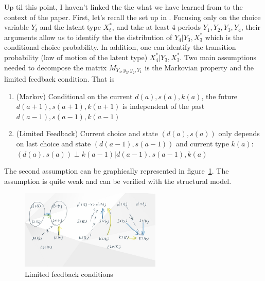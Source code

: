 \documentclass[12pt]{article}
\begin{document}
Up til this point, I haven't linked the the what we have learned from \citet{hu2012nonparametric} to the context of the paper. First, let's recall the set up in \citet{hu2012nonparametric}.
Focusing only on the choice variable $Y_t$ and the latent type $X^*_t$, and take at least 4 periods $Y_1, Y_2,Y_3,Y_4$, their arguments allow us to identify the the distribution of $Y_4|Y_3,X_3^*$ which is the conditional choice probability. In addition, one can identify the transition probability (law of motion of the latent type) $X_4^*|Y_3,X_3^*$. Two main assumptions needed to decompose the matrix $M_{Y_4,y_3,y_2,Y_1}$ is the Markovian property and the limited feedback condition. That is 
\begin{enumerate}
    \item (Markov) Conditional on the current $d(a),s(a),k(a)$, the future $d(a+1),s(a+1),k(a+1)$ is independent of the past $d(a-1),s(a-1),k(a-1)$
    \item (Limited Feedback) Current choice and state $(d(a),s(a))$ only depends on last choice and state $(d(a-1),s(a-1))$ and current type $k(a)$:  $(d(a),s(a))\perp k(a-1)|d(a-1),s(a-1),k(a)$
\end{enumerate}
The second assumption can be graphically represented in figure~\ref{fig:ass}. The assumption is quite weak and can be verified with the structural model. 

\begin{figure}[!htbp]
    \centering
    \includegraphics[width=0.6\textwidth]{../Figures/ass.jpg}
    \caption{Limited feedback conditions}
    \label{fig:ass}
    \end{figure}
\end{document}
